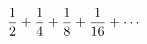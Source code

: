 \documentclass[preview]{standalone}
\begin{document}
\begin{align*}
\special{dvisvgm:raw <g id='unique000'>}\frac{1}{2} + \frac{1}{4} + \frac{1}{8} + \frac{1}{16} + \cdots\special{dvisvgm:raw </g>}
\end{align*}
\end{document}

